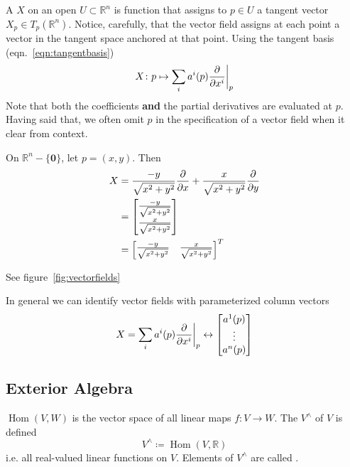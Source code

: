 A  \(X\) on an open \(U \subset \mathbb{R}^n\) is function that assigns to \(p \in U\) a tangent vector \(X_p \in T_p(\mathbb{R}^n)\).
%
Notice, carefully, that the vector field assigns at each point a vector in the tangent space anchored at that point.
%
Using the tangent basis (eqn.~\eqref{eqn:tangentbasis})
%
\begin{equation}
    X\colon p \mapsto \sum_i a^i(p) \evalat[\bigg]{\pdv{}{x^i}}{p}
\end{equation}
%
Note that both the coefficients \textbf{and} the partial derivatives are evaluated at \(p\).
%
Having said that, we often omit \(p\) in the specification of a vector field when it clear from context.
%
\begin{example}
    On \(\mathbb{R}^n - \{\bm{0}\}\), let \(p = (x,y)\). Then
    \begin{align*}
        X & = \frac{-y}{\sqrt{x^2+y^2}} \pdv{}{x} + \frac{x}{\sqrt{x^2+y^2}} \pdv{}{y} \\
          & = \begin{bmatrix}
            \frac{-y}{\sqrt{x^2+y^2}} \\ \frac{x}{\sqrt{x^2+y^2}}
        \end{bmatrix}                                               \\
          & = \begin{bmatrix}
            \frac{-y}{\sqrt{x^2+y^2}} & \frac{x}{\sqrt{x^2+y^2}}
        \end{bmatrix}^T
    \end{align*}
\end{example}
%
See figure~\ref{fig:vectorfields}

In general we can identify vector fields with parameterized column vectors
%
\begin{equation}
    X = \sum_i a^i(p) \evalat[\bigg]{\pdv{}{x^i}}{p} 
    \leftrightarrow 
    \begin{bmatrix}
        a^1(p) \\ \vdots \\ a^n(p)
    \end{bmatrix}
\end{equation}

\subsection{Exterior Algebra}

\(\operatorname{Hom}(V,W)\) is the vector space of all linear maps \(f \colon V \rightarrow W\). The  \(V^{\wedge}\) of \(V\) is defined
\[
    V^{\wedge} \coloneqq \operatorname{Hom}(V, \mathbb{R})
\]
i.e. all real-valued linear functions on \(V\). Elements of \(V^{\wedge}\) are called .

